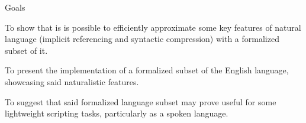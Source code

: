 
Goals

To show that is is possible to efficiently approximate some key features of natural language (implicit referencing and syntactic compression) with a formalized subset of it.

To present the implementation of a formalized subset of the English language, showcasing said naturalistic features.

To suggest that said formalized language subset may prove useful for some lightweight scripting tasks, particularly as a spoken language.

